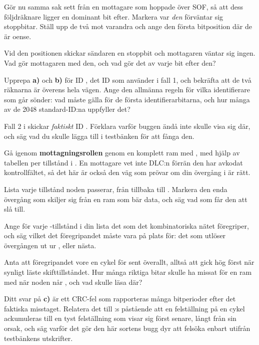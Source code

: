  Gör nu samma sak sett från en mottagare som hoppade över SOF, så att dess följdräknare
ligger en dominant bit efter. Markera var \emph{den} förväntar sig stoppbitar. Ställ upp de två mot
varandra och ange den första bitposition där de är oense.

 Vid den positionen skickar sändaren en stoppbit och mottagaren väntar sig ingen. Vad gör
mottagaren med den, och vad gör det av varje bit efter den?

 Upprepa \textbf{a)} och \textbf{b)} för ID , det ID som
 använder i fall 1, och bekräfta att de två räknarna är överens hela vägen.
Ange den allmänna regeln för vilka identifierare som går sönder: vad måste gälla för de första
identifierarbitarna, och hur många av de 2048 standard-ID:na uppfyller det?

 Fall 2 i  skickar \emph{faktiskt} ID . Förklara varför
buggen ändå inte skulle visa sig där, och säg vad du skulle lägga till i testbänken för att fånga
den.

\label{c17:ex:dlc0}
Gå igenom \textbf{mottagningsrollen} genom en komplett ram med , med hjälp av tabellen
per tillstånd i . En mottagare vet inte DLC:n förrän den har avkodat
kontrollfältet, så det här är också den väg som prövar om din övergång i  är rätt.

 Lista varje tillstånd noden passerar, från  tillbaka till
. Markera den enda övergång som skiljer sig från en ram som bär data, och säg vad
som får den att slå till.

 Ange för varje -tillstånd i din lista det  som det
kombinatoriska nätet föregriper, och säg vilket  det föregripandet måste vara på
plats för: det som utlöser övergången ut ur , eller nästa.

 Anta att föregripandet vore en cykel för sent överallt, alltså att  gick
hög först när  synligt läste skifttillståndet. Hur många riktiga bitar skulle
 ha missat för en ram med  när noden når ,
och vad skulle  läsa där?

 Ditt svar på \textbf{c)} är ett CRC-fel som rapporteras många bitperioder efter det
faktiska misstaget. Relatera det till :s påstående att en felställning på en
cykel ackumuleras till en tyst felställning som visar sig först senare, långt från sin orsak, och säg
varför det gör den här sortens bugg dyr att felsöka enbart utifrån testbänkens utskrifter.
